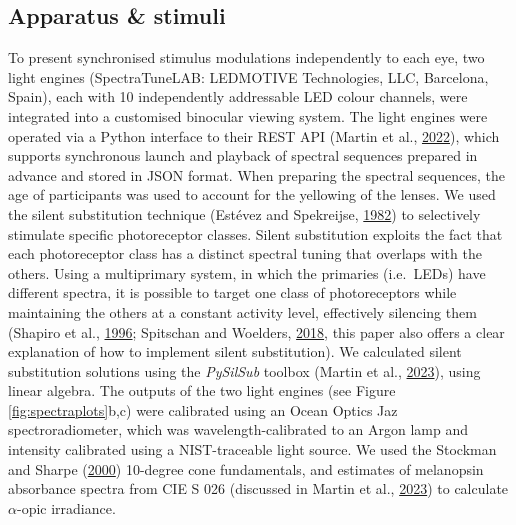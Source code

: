 \documentclass[
]{article}
\begin{document}
\hypertarget{apparatus-stimuli}{%
\subsection{Apparatus \& stimuli}\label{apparatus-stimuli}}

To present synchronised stimulus modulations independently to each eye, two light engines (SpectraTuneLAB: LEDMOTIVE Technologies, LLC, Barcelona, Spain), each with 10 independently addressable LED colour channels, were integrated into a customised binocular viewing system. The light engines were operated via a Python interface to their REST API (Martin et al., \protect\hyperlink{ref-Martin2022}{2022}), which supports synchronous launch and playback of spectral sequences prepared in advance and stored in JSON format. When preparing the spectral sequences, the age of participants was used to account for the yellowing of the lenses. We used the silent substitution technique (Estévez and Spekreijse, \protect\hyperlink{ref-Estevez1982}{1982}) to selectively stimulate specific photoreceptor classes. Silent substitution exploits the fact that each photoreceptor class has a distinct spectral tuning that overlaps with the others. Using a multiprimary system, in which the primaries (i.e.~LEDs) have different spectra, it is possible to target one class of photoreceptors while maintaining the others at a constant activity level, effectively silencing them (Shapiro et al., \protect\hyperlink{ref-Shapiro1996}{1996}; Spitschan and Woelders, \protect\hyperlink{ref-Spitschan2018}{2018}, this paper also offers a clear explanation of how to implement silent substitution). We calculated silent substitution solutions using the \emph{PySilSub} toolbox (Martin et al., \protect\hyperlink{ref-Martin2023}{2023}), using linear algebra. The outputs of the two light engines (see Figure \ref{fig:spectraplots}b,c) were calibrated using an Ocean Optics Jaz spectroradiometer, which was wavelength-calibrated to an Argon lamp and intensity calibrated using a NIST-traceable light source. We used the Stockman and Sharpe (\protect\hyperlink{ref-Stockman2000}{2000}) 10-degree cone fundamentals, and estimates of melanopsin absorbance spectra from CIE S 026 (discussed in Martin et al., \protect\hyperlink{ref-Martin2023}{2023}) to calculate \(\alpha\)-opic irradiance.
\end{document}
